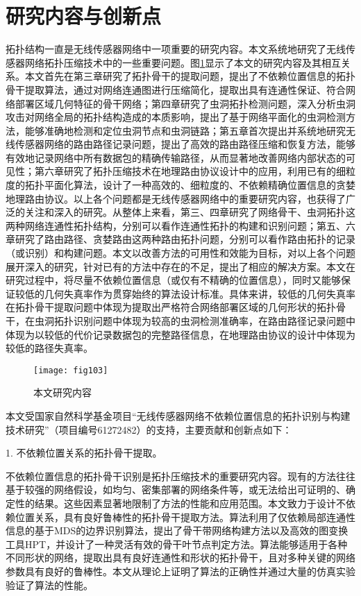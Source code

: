 \section{研究内容与创新点}
拓扑结构一直是无线传感器网络中一项重要的研究内容。本文系统地研究了无线传感器网络拓扑压缩技术中的一些重要问题。图\ref{fig:103}显示了本文的研究内容及其相互关系。本文首先在第三章研究了拓扑骨干的提取问题，提出了不依赖位置信息的拓扑骨干提取算法，通过对网络连通图进行压缩简化，提取出具有连通性保证、符合网络部署区域几何特征的骨干网络；第四章研究了虫洞拓扑检测问题，深入分析虫洞攻击对网络全局的拓扑结构造成的本质影响，提出了基于网络平面化的虫洞检测方法，能够准确地检测和定位虫洞节点和虫洞链路；第五章首次提出并系统地研究无线传感器网络的路由路径记录问题，提出了高效的路由路径压缩和恢复方法，能够有效地记录网络中所有数据包的精确传输路径，从而显著地改善网络内部状态的可见性；第六章研究了拓扑压缩技术在地理路由协议设计中的应用，利用已有的细粒度的拓扑平面化算法，设计了一种高效的、细粒度的、不依赖精确位置信息的贪婪地理路由协议。以上各个问题都是无线传感器网络中的重要研究内容，也获得了广泛的关注和深入的研究。从整体上来看，第三、四章研究了网络骨干、虫洞拓扑这两种网络连通性拓扑结构，分别可以看作连通性拓扑的构建和识别问题；第五、六章研究了路由路径、贪婪路由这两种路由拓扑问题，分别可以看作路由拓扑的记录（或识别）和构建问题。本文以改善方法的可用性和效能为目标，对以上各个问题展开深入的研究，针对已有的方法中存在的不足，提出了相应的解决方案。本文在研究过程中，将尽量不依赖位置信息（或仅有不精确的位置信息），同时又能够保证较低的几何失真率作为贯穿始终的算法设计标准。具体来讲，较低的几何失真率在拓扑骨干提取问题中体现为提取出严格符合网络部署区域的几何形状的拓扑骨干，在虫洞拓扑识别问题中体现为较高的虫洞检测准确率，在路由路径记录问题中体现为以较低的代价记录数据包的完整路径信息，在地理路由协议的设计中体现为较低的路径失真率。
\begin{figure}[t] %
  \centering
  \texttt{[image: fig103]}
  \caption{本文研究内容}
  \label{fig:103}
\end{figure}

本文受国家自然科学基金项目“无线传感器网络不依赖位置信息的拓扑识别与构建技术研究”（项目编号61272482）的支持，主要贡献和创新点如下：

1. 不依赖位置关系的拓扑骨干提取。

不依赖位置信息的拓扑骨干识别是拓扑压缩技术的重要研究内容。现有的方法往往基于较强的网络假设，如均匀、密集部署的网络条件等，或无法给出可证明的、确定性的结果。这些因素显著地限制了方法的性能和应用范围。本文致力于设计不依赖位置关系，具有良好鲁棒性的拓扑骨干提取方法。算法利用了仅依赖局部连通性信息的基于MDS的边界识别算法，提出了骨干带网络构建方法以及高效的图变换工具HPT，并设计了一种灵活有效的骨干叶节点判定方法。算法能够适用于各种不同形状的网络，提取出具有良好连通性和形状的拓扑骨干，且对多种关键的网络参数具有良好的鲁棒性。本文从理论上证明了算法的正确性并通过大量的仿真实验验证了算法的性能。

